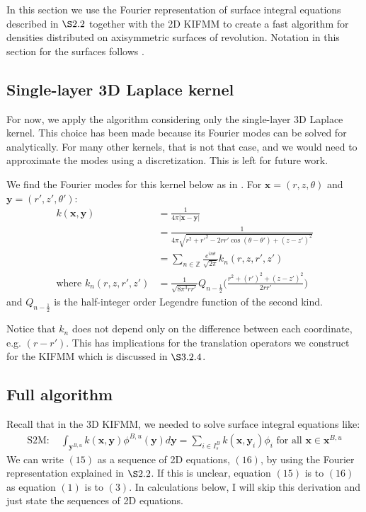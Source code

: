 \documentclass[11pt, oneside]{article}   	%
\begin{document}
In this section we use the Fourier representation of surface integral equations described in $\S2.2$ together with the 2D KIFMM to create a fast algorithm for densities distributed on axisymmetric surfaces of revolution. Notation in this section for the surfaces follows \cite{YBZ}.

\subsection{Single-layer 3D Laplace kernel}
For now, we apply the algorithm considering only the single-layer 3D Laplace kernel. This choice has been made because its Fourier modes can be solved for analytically. For many other kernels, that is not that case, and we would need to approximate the modes using a discretization. This is left for future work.

We find the Fourier modes for this kernel below as in \cite{YYM}. For $\mathbf{x}=(r,z,\theta)$ and $\mathbf{y}=(r',z',\theta')$:
\begin{align}
k(\mathbf{x},\mathbf{y})&=\frac{1}{4\pi |\mathbf{x}-\mathbf{y}|}\\
&=\frac{1}{4\pi\sqrt{r^2+r'^2-2rr'\cos{(\theta-\theta')}+(z-z')^2}}\\
&=\sum_{n\in\mathbb{Z}}\frac{e^{in\theta}}{\sqrt{2\pi}}k_n(r,z,r',z')\\
\mbox{where }k_n(r,z,r',z')&=\frac{1}{\sqrt{8\pi^3rr'}}Q_{n-\frac{1}{2}}\bigg(\frac{r^2+(r')^2+(z-z')^2}{2rr'}\bigg)
\end{align}
and $Q_{n-\frac{1}{2}}$ is the half-integer order Legendre function of the second kind.

Notice that $k_n$ does not depend only on the difference between each coordinate, e.g. $(r-r')$. This has implications for the translation operators we construct for the KIFMM which is discussed in $\S3.2.4$.

\subsection{Full algorithm}
Recall that in the 3D KIFMM, we needed to solve surface integral equations like:
\begin{align}
\mbox{S2M: }&\int_{\mathbf{y}^{B,u}}{k(\mathbf{x},\mathbf{y})}\phi^{B,u}{(\mathbf{y})}d\mathbf{y}=\sum\limits_{i\in I_s^B} k(\mathbf{x},\mathbf{y}_i)\phi_i\mbox{ for all }\mathbf{x}\in\mathbf{x}^{B,u}
\end{align}
We can write $(15)$ as a sequence of 2D equations, $(16)$, by using the Fourier representation explained in $\S2.2$. If this is unclear, equation $(15)$ is to $(16)$ as equation $(1)$ is to $(3)$. In calculations below, I will skip this derivation and just state the sequences of 2D equations.
\end{document}
